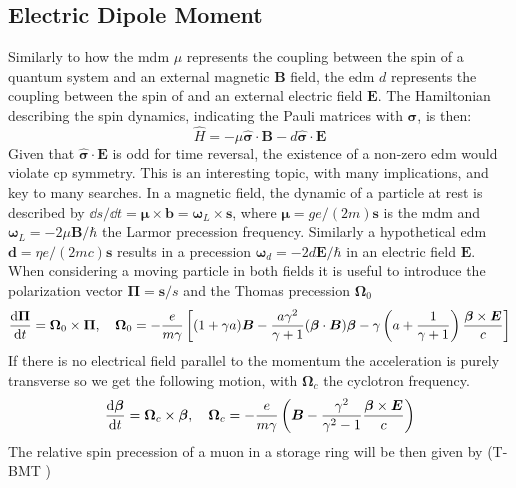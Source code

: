 \begin{refsection}
    \subsection{Electric Dipole Moment}
        \label{intro:edm}
        Similarly to how the \gls{mdm} $\mu$ represents the coupling between the spin of a quantum system and an external magnetic $\bm{B}$ field, the \gls{edm} $d$ represents the coupling between the spin of and an external electric field $\bm{E}$.
        The Hamiltonian describing the spin dynamics, indicating the Pauli matrices with $\bm{\sigma}$, is then:
        \begin{equation}
            \hat{H} = -\mu\bm{\hat{\sigma}\cdot B}-d\bm{\hat{\sigma}\cdot E}
        \end{equation}
        Given that $\bm{\hat{\sigma}\cdot E}$ is odd for time reversal, the existence of a non-zero \gls{edm} would violate \gls{cp} symmetry. 
        This is an interesting topic, with many implications, and key to many searches. 
        In a magnetic field, the dynamic of a particle at rest is described by $\dd s/\dd t=\bm{\mu}\times\bm{b} = \bm{\omega}_L\times\bm{s}$, where $\bm{\mu}=ge/(2m)\bm{s}$ is the \gls{mdm} and $\bm{\omega}_L=-2\mu\bm{B}/\hbar$ the Larmor precession frequency.
        Similarly a hypothetical \gls{edm} $\bm{d}=\eta e/(2mc)\bm{s}$ results in a precession $\bm{\omega}_d=-2d\bm{E}/\hbar$ in an electric field $\bm{E}$.
    When considering a moving particle in both fields it is useful to introduce the polarization vector $\bm{\Pi}=\bm{s}/s$ and the Thomas precession $\bm{\Omega}_0$
    \begin{equation}
        \dv{\bm{\Pi}}{t}=\bm{\Omega}_0 \times \bm{\Pi}, \quad
        \bm{\Omega}_0 = -\frac{e}{m\gamma} \left[ (1+\gamma a)\bm{B}-\frac{a\gamma^2}{\gamma+1}(\bm{\beta}\cdot\bm{B})\bm{\beta}-\gamma \left( a+\frac{1}{\gamma+1} \right) \frac{\bm{\beta}\times \bm{E}}{c} \right]
    \end{equation}
    \cite{muEDM:Flavour:2008}\cite{muEDM:Ring:2004}
    If there is no electrical field parallel to the momentum the acceleration is purely transverse so we get the following motion, with $\bm{\Omega}_c$ the cyclotron frequency.
    \begin{equation}
        \dv{\bm{\beta}}{t}=\bm{\Omega}_c\times \bm{\beta}, \quad \bm{\Omega}_c = -\frac{e}{m\gamma}\left( \bm{B}- \frac{\gamma^2}{\gamma^2-1}\frac{\bm{\beta} \times \bm{E}}{c} \right)
    \end{equation}
    The relative spin precession of a muon in a storage ring will be then given by (T-BMT \cite{miss-59})

\end{refsection}
